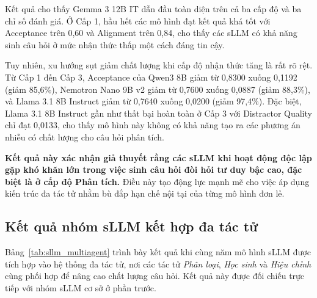 Kết quả cho thấy Gemma 3 12B IT dẫn đầu toàn diện trên cả ba cấp độ và ba chỉ số đánh giá. Ở Cấp 1, hầu hết các mô hình đạt kết quả khá tốt với Acceptance trên 0,60 và Alignment trên 0,84, cho thấy các sLLM có khả năng sinh câu hỏi ở mức nhận thức thấp một cách đáng tin cậy.

Tuy nhiên, xu hướng sụt giảm chất lượng khi cấp độ nhận thức tăng là rất rõ rệt. Từ Cấp 1 đến Cấp 3, Acceptance của Qwen3 8B giảm từ 0,8300 xuống 0,1192 (giảm 85,6\%), Nemotron Nano 9B v2 giảm từ 0,7600 xuống 0,0887 (giảm 88,3\%), và Llama 3.1 8B Instruct giảm từ 0,7640 xuống 0,0200 (giảm 97,4\%). Đặc biệt, Llama 3.1 8B Instruct gần như thất bại hoàn toàn ở Cấp 3 với Distractor Quality chỉ đạt 0,0133, cho thấy mô hình này không có khả năng tạo ra các phương án nhiễu có chất lượng cho câu hỏi phân tích.

\textbf{Kết quả này xác nhận giả thuyết rằng các sLLM khi hoạt động độc lập gặp khó khăn lớn trong việc sinh câu hỏi đòi hỏi tư duy bậc cao, đặc biệt là ở cấp độ Phân tích.} Điều này tạo động lực mạnh mẽ cho việc áp dụng kiến trúc đa tác tử nhằm bù đắp hạn chế nội tại của từng mô hình đơn lẻ.

\subsection{Kết quả nhóm sLLM kết hợp đa tác tử}

Bảng~\ref{tab:sllm_multiagent} trình bày kết quả khi cùng năm mô hình sLLM được tích hợp vào hệ thống đa tác tử, nơi các tác tử \textit{Phân loại}, \textit{Học sinh} và \textit{Hiệu chỉnh} cùng phối hợp để nâng cao chất lượng câu hỏi. Kết quả này được đối chiếu trực tiếp với nhóm sLLM cơ sở ở phần trước.

\begin{table}[htbp]
\centering
\caption{Kết quả đánh giá nhóm sLLM đa tác tử trên bộ dữ liệu RACE-High}
\label{tab:sllm_multiagent}
\end{table}

